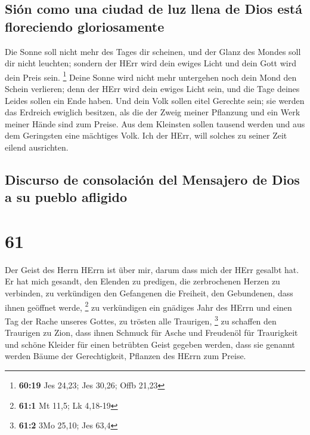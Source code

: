 \hypertarget{siuxf3n-como-una-ciudad-de-luz-llena-de-dios-estuxe1-floreciendo-gloriosamente}{%
\subsection{Sión como una ciudad de luz llena de Dios está floreciendo
gloriosamente}\label{siuxf3n-como-una-ciudad-de-luz-llena-de-dios-estuxe1-floreciendo-gloriosamente}}

 Die Sonne soll nicht mehr des Tages dir scheinen, und
der Glanz des Mondes soll dir nicht leuchten; sondern der HErr wird dein
ewiges Licht und dein Gott wird dein Preis sein. \footnote{\textbf{60:19}
  Jes 24,23; Jes 30,26; Offb 21,23}  Deine Sonne wird
nicht mehr untergehen noch dein Mond den Schein verlieren; denn der HErr
wird dein ewiges Licht sein, und die Tage deines Leides sollen ein Ende
haben.  Und dein Volk sollen eitel Gerechte sein; sie
werden das Erdreich ewiglich besitzen, als die der Zweig meiner
Pflanzung und ein Werk meiner Hände sind zum Preise.  Aus
dem Kleinsten sollen tausend werden und aus dem Geringsten eine
mächtiges Volk. Ich der HErr, will solches zu seiner Zeit eilend
ausrichten.

\hypertarget{discurso-de-consolaciuxf3n-del-mensajero-de-dios-a-su-pueblo-afligido}{%
\subsection{Discurso de consolación del Mensajero de Dios a su pueblo
afligido}\label{discurso-de-consolaciuxf3n-del-mensajero-de-dios-a-su-pueblo-afligido}}

\hypertarget{section-60}{%
\section{61}\label{section-60}}

 Der Geist des Herrn HErrn ist über mir, darum dass mich
der HErr gesalbt hat. Er hat mich gesandt, den Elenden zu predigen, die
zerbrochenen Herzen zu verbinden, zu verkündigen den Gefangenen die
Freiheit, den Gebundenen, dass ihnen geöffnet werde, \footnote{\textbf{61:1}
  Mt 11,5; Lk 4,18-19}  zu verkündigen ein gnädiges Jahr
des HErrn und einen Tag der Rache unseres Gottes, zu trösten alle
Traurigen, \footnote{\textbf{61:2} 3Mo 25,10; Jes 63,4} 
zu schaffen den Traurigen zu Zion, dass ihnen Schmuck für Asche und
Freudenöl für Traurigkeit und schöne Kleider für einen betrübten Geist
gegeben werden, dass sie genannt werden Bäume der Gerechtigkeit,
Pflanzen des HErrn zum Preise.

